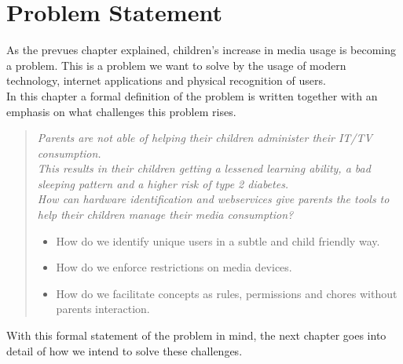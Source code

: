 \chapter{Problem Statement}
As the prevues chapter explained, children's increase in media usage is becoming a problem. This is a problem we want to solve by the usage of modern technology, internet applications and physical recognition of users.\\
In this chapter a formal definition of the problem is written together with an emphasis on what challenges this problem rises.\\


\begin{verse}
\textit{Parents are not able of helping their children administer their IT/TV consumption.\\
This results in their children getting a lessened learning ability, a bad sleeping pattern and a higher risk of type 2 diabetes.\\
How can hardware identification and webservices give parents the tools to help their children manage their media consumption?}
	\begin{itemize}
		\item How do we identify unique users in a subtle and child friendly way.
		\item How do we enforce restrictions on media devices.
		\item How do we facilitate concepts as rules, permissions and chores without parents interaction.
	\end{itemize}
\end{verse}


With this formal statement of the problem in mind, the next chapter goes into detail of how we intend to solve these challenges.



